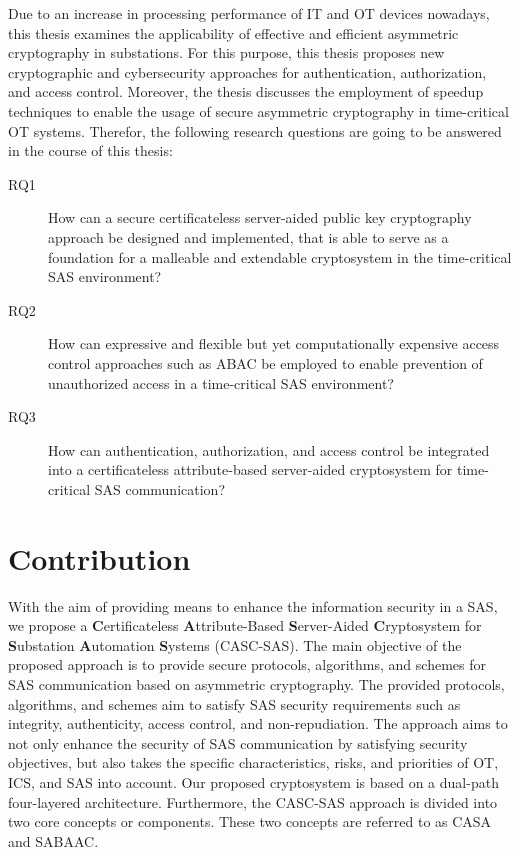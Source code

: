 Due to an increase in processing performance of IT and OT devices nowadays, this thesis examines the applicability of effective and efficient asymmetric cryptography in substations.
For this purpose, this thesis proposes new cryptographic and cybersecurity approaches for authentication, authorization, and access control.
Moreover, the thesis discusses the employment of speedup techniques to enable the usage of secure asymmetric cryptography in time-critical OT systems.
Therefor, the following research questions are going to be answered in the course of this thesis:
\begin{description}
    \item[RQ1] How can a secure certificateless server-aided public key cryptography approach be designed and implemented, that is able to serve as a foundation for a malleable and extendable cryptosystem in the time-critical SAS environment?
    \item[RQ2] How can expressive and flexible but yet computationally expensive access control approaches such as ABAC be employed to enable prevention of unauthorized access in a time-critical SAS environment?
    \item[RQ3] How can authentication, authorization, and access control be integrated into a certificateless attribute-based server-aided cryptosystem for time-critical SAS communication?
\end{description}

\section{Contribution}
\label{sec:introduction:contribution}
With the aim of providing means to enhance the information security in a SAS, we propose a \textbf{C}ertificateless \textbf{A}ttribute-Based \textbf{S}erver-Aided \textbf{C}ryptosystem for \textbf{S}ubstation \textbf{A}utomation \textbf{S}ystems (CASC-SAS).
The main objective of the proposed approach is to provide secure protocols, algorithms, and schemes for SAS communication based on asymmetric cryptography.
The provided protocols, algorithms, and schemes aim to satisfy SAS security requirements such as integrity, authenticity, access control, and non-repudiation.
The approach aims to not only enhance the security of SAS communication by satisfying security objectives, but also takes the specific characteristics, risks, and priorities of OT, ICS, and SAS into account.
Our proposed cryptosystem is based on a dual-path four-layered architecture.
Furthermore, the CASC-SAS approach is divided into two core concepts or components.
These two concepts are referred to as CASA and SABAAC.

